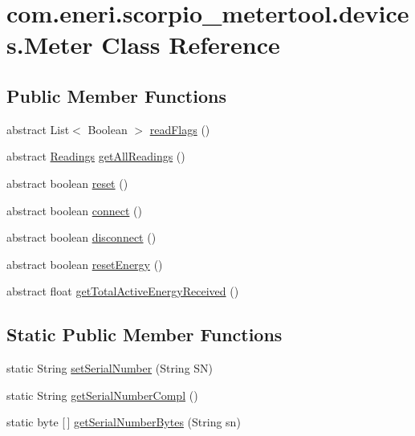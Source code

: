\hypertarget{classcom_1_1eneri_1_1scorpio__metertool_1_1devices_1_1_meter}{}\section{com.\+eneri.\+scorpio\+\_\+metertool.\+devices.\+Meter Class Reference}
\label{classcom_1_1eneri_1_1scorpio__metertool_1_1devices_1_1_meter}
\subsection*{Public Member Functions}
\begin{DoxyCompactItemize}
\item 
abstract List$<$ Boolean $>$ \hyperlink{classcom_1_1eneri_1_1scorpio__metertool_1_1devices_1_1_meter_a828de2c0a50d774b2328f01370a66984}{read\+Flags} ()
\item 
abstract \hyperlink{classcom_1_1eneri_1_1scorpio__metertool_1_1devices_1_1_readings}{Readings} \hyperlink{classcom_1_1eneri_1_1scorpio__metertool_1_1devices_1_1_meter_af4668b768f755030e88eb0cb66728e60}{get\+All\+Readings} ()
\item 
abstract boolean \hyperlink{classcom_1_1eneri_1_1scorpio__metertool_1_1devices_1_1_meter_ac6ba368dd0057ae3d25533569faf57ed}{reset} ()
\item 
abstract boolean \hyperlink{classcom_1_1eneri_1_1scorpio__metertool_1_1devices_1_1_meter_af24519e235b9d1fc9e9a4c5c9a086913}{connect} ()
\item 
abstract boolean \hyperlink{classcom_1_1eneri_1_1scorpio__metertool_1_1devices_1_1_meter_abc81473c7f2e798d9a67e1454caacbe8}{disconnect} ()
\item 
abstract boolean \hyperlink{classcom_1_1eneri_1_1scorpio__metertool_1_1devices_1_1_meter_ab864ba7d218abd2f9b5b29fec1deae50}{reset\+Energy} ()
\item 
abstract float \hyperlink{classcom_1_1eneri_1_1scorpio__metertool_1_1devices_1_1_meter_adfbc68099022cb882b6c5368db0f5141}{get\+Total\+Active\+Energy\+Received} ()
\end{DoxyCompactItemize}
\subsection*{Static Public Member Functions}
\begin{DoxyCompactItemize}
\item 
static String \hyperlink{classcom_1_1eneri_1_1scorpio__metertool_1_1devices_1_1_meter_a02be218a4c279ab0f0858a3863ffac9c}{set\+Serial\+Number} (String SN)
\item 
static String \hyperlink{classcom_1_1eneri_1_1scorpio__metertool_1_1devices_1_1_meter_a8031b7880275cbf7a679ccfdf728ae18}{get\+Serial\+Number\+Compl} ()
\item 
static byte \mbox{[}$\,$\mbox{]} \hyperlink{classcom_1_1eneri_1_1scorpio__metertool_1_1devices_1_1_meter_ad13b936023eff76571099e4c9e3589e9}{get\+Serial\+Number\+Bytes} (String sn)
\end{DoxyCompactItemize}
